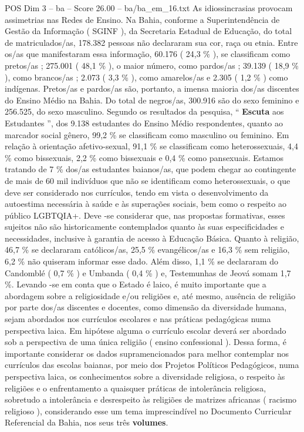 \begin{textsample}{POS Dim 3 – ba – Score 26.00 – ba/ba\_em\_16.txt}
As idiossincrasias provocam assimetrias nas Redes de Ensino.
Na Bahia, conforme a Superintendência de Gestão da Informação ( SGINF ), da Secretaria Estadual de Educação, do total de matriculados/as, 178.382 pessoas não declararam sua cor, raça ou etnia.
Entre os/as que manifestaram essa informação, 60.176 ( 24,3 \% ), se classificam como pretos/as ; 275.001 ( 48,1 \% ), o maior número, como pardos/as ; 39.139 ( 18,9 \% ), como brancos/as ; 2.073 ( 3,3 \% ), como amarelos/as e 2.305 ( 1,2 \% ) como indígenas.
Pretos/as e pardos/as são, portanto, a imensa maioria dos/as discentes do Ensino Médio na Bahia.
Do total de negros/as, 300.916 são do sexo feminino e 256.525, do sexo masculino.
Segundo os resultados da pesquisa, “ \textbf{Escuta} aos Estudantes ”, dos 9.138 estudantes do Ensino Médio respondentes, quanto ao marcador social gênero, 99,2 \% se classificam como masculino ou feminino.
Em relação à orientação afetivo-sexual, 91,1 \% se classificam como heterossexuais, 4,4 \% como bissexuais, 2,2 \% como bissexuais e 0,4 \% como pansexuais.
Estamos tratando de 7 \% dos/as estudantes baianos/as, que podem chegar ao contingente de mais de 60 mil indivíduos que não se identificam como heterossexuais, o que deve ser considerado nos currículos, tendo em vista o desenvolvimento da autoestima necessária à saúde e às superações sociais, bem como o respeito ao público LGBTQIA+.
Deve -se considerar que, nas propostas formativas, esses sujeitos não são historicamente contemplados quanto às suas especificidades e necessidades, inclusive à garantia de acesso à Educação Básica.
Quanto à religião, 46,7 \% se declararam católicos/as, 25,5 \% evangélicos/as e 16,3 \% sem religião, 6,2 \% não quiseram informar esse dado.
Além disso, 1,1 \% se declararam do Candomblé ( 0,7 \% ) e Umbanda ( 0,4 \% ) e, Testemunhas de Jeová somam 1,7 \%.
Levando -se em conta que o Estado é laico, é muito importante que a abordagem sobre a religiosidade e/ou religiões e, até mesmo, ausência de religião por parte dos/as discentes e docentes, como dimensão da diversidade humana, sejam abordados nos currículos escolares e nas práticas pedagógicas numa perspectiva laica.
Em hipótese alguma o currículo escolar deverá ser abordado sob a perspectiva de uma única religião ( ensino confessional ).
Dessa forma, é importante considerar os dados supramencionados para melhor contemplar nos currículos das escolas baianas, por meio dos Projetos Políticos Pedagógicos, numa perspectiva laica, os conhecimentos sobre a diversidade religiosa, o respeito às religiões e o enfrentamento a quaisquer práticas de intolerância religiosa, sobretudo a intolerância e desrespeito às religiões de matrizes africanas ( racismo religioso ), considerando esse um tema imprescindível no Documento Curricular Referencial da Bahia, nos seus três \textbf{volumes}.

\end{textsample}
